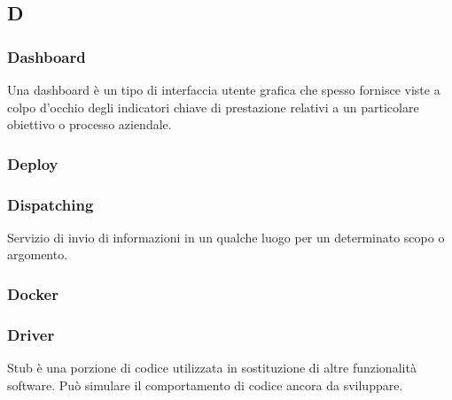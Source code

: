 \subsection*{\textbf{\hfill \Huge{D} \hfill}} 
\subsubsection*{Dashboard}
Una dashboard è un tipo di interfaccia utente grafica che spesso fornisce viste a colpo d’occhio degli indicatori chiave di prestazione relativi a un particolare obiettivo o processo aziendale.
\subsubsection*{Deploy}

\subsubsection*{Dispatching}
Servizio di invio di informazioni in un qualche luogo per un determinato scopo o argomento.
\subsubsection*{Docker}

\subsubsection*{Driver}
Stub è una porzione di codice utilizzata in sostituzione di altre funzionalità software. Può simulare il comportamento di codice ancora da sviluppare.
